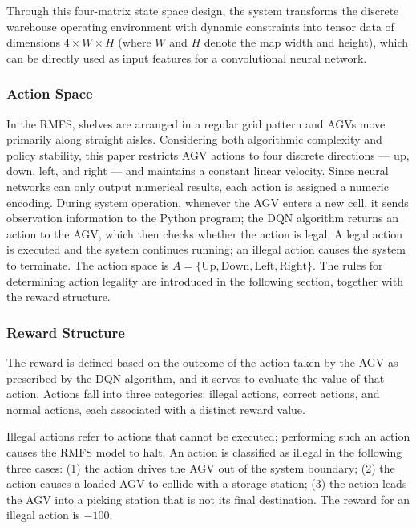 Through this four-matrix state space design, the system transforms the discrete warehouse operating environment with dynamic constraints into tensor data of dimensions $4 \times W \times H$ (where $W$ and $H$ denote the map width and height), which can be directly used as input features for a convolutional neural network.

\subsubsection{Action Space}

In the RMFS, shelves are arranged in a regular grid pattern and AGVs move primarily along straight aisles. Considering both algorithmic complexity and policy stability, this paper restricts AGV actions to four discrete directions — up, down, left, and right — and maintains a constant linear velocity. Since neural networks can only output numerical results, each action is assigned a numeric encoding. During system operation, whenever the AGV enters a new cell, it sends observation information to the Python program; the DQN algorithm returns an action to the AGV, which then checks whether the action is legal. A legal action is executed and the system continues running; an illegal action causes the system to terminate. The action space is $A = \{\text{Up}, \text{Down}, \text{Left}, \text{Right}\}$. The rules for determining action legality are introduced in the following section, together with the reward structure.

\subsubsection{Reward Structure}

The reward is defined based on the outcome of the action taken by the AGV as prescribed by the DQN algorithm, and it serves to evaluate the value of that action. Actions fall into three categories: illegal actions, correct actions, and normal actions, each associated with a distinct reward value.

Illegal actions refer to actions that cannot be executed; performing such an action causes the RMFS model to halt. An action is classified as illegal in the following three cases: (1) the action drives the AGV out of the system boundary; (2) the action causes a loaded AGV to collide with a storage station; (3) the action leads the AGV into a picking station that is not its final destination. The reward for an illegal action is $-100$.

